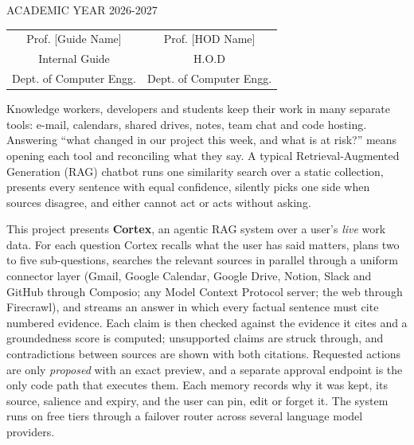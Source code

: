 \documentclass[oneside,a4paper,12pt]{report}
\providecommand{\frontmatter}{}                              %
\begin{document}
 \begin{center}
 ACADEMIC YEAR 2026-2027
 \end{center}

 \vspace*{1\baselineskip} %
 \begin{tabular}{c c }
Prof. [Guide Name] &  \hspace{50 mm} Prof. [HOD Name] \\
Internal Guide   &  \hspace{50 mm} H.O.D \\
Dept. of Computer Engg.  &	\hspace{50 mm}Dept. of Computer Engg.  \\
\end{tabular}
\newpage

\setcounter{page}{0}
\frontmatter
{}
\rfoot{\thepage}


{   \setlength{\parindent}{11mm} }
{ \setlength{\parindent}{0mm} }
Knowledge workers, developers and students keep their work in many separate tools: e-mail, calendars, shared drives, notes, team chat and code hosting. Answering ``what changed in our project this week, and what is at risk?'' means opening each tool and reconciling what they say. A typical Retrieval-Augmented Generation (RAG) chatbot runs one similarity search over a static collection, presents every sentence with equal confidence, silently picks one side when sources disagree, and either cannot act or acts without asking.

\vspace*{0.5\baselineskip}
This project presents \textbf{Cortex}, an agentic RAG system over a user's \emph{live} work data. For each question Cortex recalls what the user has said matters, plans two to five sub-questions, searches the relevant sources in parallel through a uniform connector layer (Gmail, Google Calendar, Google Drive, Notion, Slack and GitHub through Composio; any Model Context Protocol server; the web through Firecrawl), and streams an answer in which every factual sentence must cite numbered evidence. Each claim is then checked against the evidence it cites and a groundedness score is computed; unsupported claims are struck through, and contradictions between sources are shown with both citations. Requested actions are only \emph{proposed} with an exact preview, and a separate approval endpoint is the only code path that executes them. Each memory records why it was kept, its source, salience and expiry, and the user can pin, edit or forget it. The system runs on free tiers through a failover router across several language model providers.
\end{document}
